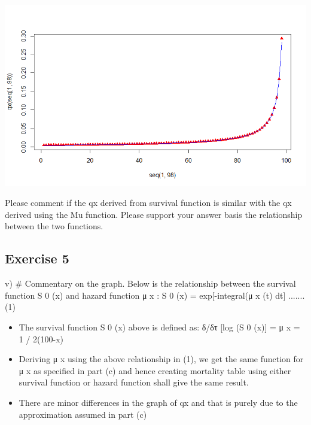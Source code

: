 \documentclass[a4paper,12pt]{article}
\begin{document}
\includegraphics[scale=0.6]{00-B2/images/Mortality_4_Curve.png}

\newpage 



Please comment if the qx derived from survival function is similar with the qx derived
using the Mu function. Please support your answer basis the relationship between the
two functions.



\newpage
\subsection*{Exercise 5}
v) # Commentary on the graph.
Below is the relationship between the survival function S 0 (x) and hazard function μ x :
S 0 (x) = exp[-integral(μ x (t) dt]
.......(1)


\begin{itemize}
    \item The survival function S 0 (x) above is defined as:
δ/δτ [log (S 0 (x)] = μ x = 1 / 2(100-x)
    \item Deriving μ x using the above relationship in (1), we get the same function for μ x as specified in part (c) and
hence creating mortality table using either survival function or hazard function shall give the same result.
    \item There are minor differences in the graph of qx and that is purely due to the approximation assumed in part (c)
\end{itemize}
\end{document}
